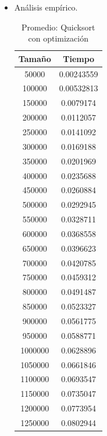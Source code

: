 \documentclass[a4paper,12pt,twoside]{article} %
\begin{document}
\begin{itemize}
	
	\item Análisis empírico.
	
\begin{table}[h]
	\begin{center}
		\begin{tabular}{|c|c|}
		\hline
		Tamaño & Tiempo \\
		\hline
		50000 & 0.00243559 \\
		100000 & 0.00532813 \\
		150000 & 0.0079174 \\
		200000 & 0.0112057 \\
		250000 & 0.0141092 \\
		300000 & 0.0169188 \\
		350000 & 0.0201969 \\
		400000 & 0.0235688 \\
		450000 & 0.0260884 \\
		500000 & 0.0292945 \\
		550000 & 0.0328711 \\
		600000 & 0.0368558 \\
		650000 & 0.0396623 \\
		700000 & 0.0420785 \\
		750000 & 0.0459312 \\
		800000 & 0.0491487 \\
		850000 & 0.0523327 \\
		900000 & 0.0561775 \\
		950000 & 0.0588771 \\
		1000000 & 0.0628896 \\
		1050000 & 0.0661846 \\
		1100000 & 0.0693547 \\
		1150000 & 0.0735047 \\
		1200000 & 0.0773954 \\
		1250000 & 0.0802944 \\
		\hline
		\end{tabular}
	\end{center}
	\caption{Promedio: Quicksort con optimización}
\end{table}
\newpage

\begin{figure}[h]
  \begin{center}
  

\end{center}
\end{figure}
\end{itemize}
\end{document}
